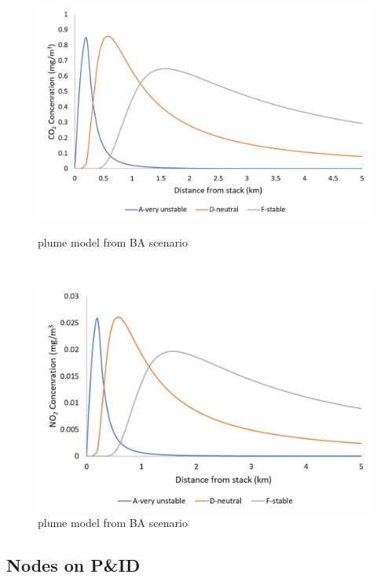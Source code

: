 \begin{figure}[H]
    \centering
    \begin{minipage}[t]{0.5\textwidth}
        \centering
        \includegraphics[width=\linewidth]{chapters/5-safety-layout-environment/figures/CO2plumeBA.jpg}
        \caption{ plume model from BA scenario}
        \label{fig:CO2plumeBA}
    \end{minipage}%
    ~ 
    \begin{minipage}[t]{0.5\textwidth}
        \centering
        \includegraphics[width=\linewidth]{chapters/5-safety-layout-environment/figures/NO2plumeBA.jpg}
        \caption{ plume model from BA scenario}
         \label{fig:NO2plumeBA}
    \end{minipage}
    
\end{figure}


\subsection{Nodes on P\&ID}
\label{app:nodes}

